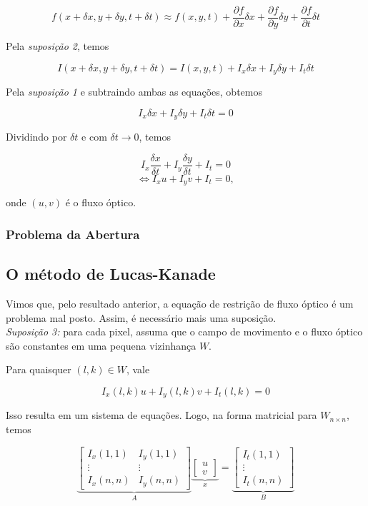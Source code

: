 \documentclass[12pt, a4paper]{article}
\begin{document}
\[ f(x + \delta x, y + \delta y, t + \delta t) \approx f(x, y, t) + \frac{\partial f}{\partial x} \delta x + \frac{\partial f}{\partial y} \delta y + \frac{\partial f}{\partial t} \delta t \]

Pela \textit{suposição 2}, temos

\[ I(x + \delta x, y + \delta y, t + \delta t) = I(x, y, t) + I_x \delta x + I_y \delta y + I_t \delta t\]

Pela \textit{suposição 1} e subtraindo ambas as equações, obtemos

\[ I_x \delta x + I_y \delta y + I_t \delta t = 0\]

Dividindo por $\delta t$ e com $\delta t \to 0$, temos

\[ I_x \frac{\delta x}{\delta t} + I_y \frac{\delta y}{\delta t} + I_t  = 0\]
\[ \Leftrightarrow I_x u + I_y v + I_t  = 0, \]

onde $(u, v)$ é o fluxo óptico.

\subsubsection{Problema da Abertura}

\subsection{O método de Lucas-Kanade}

Vimos que, pelo resultado anterior, a equação de restrição de fluxo óptico é um problema mal posto. Assim, é necessário mais uma suposição. \\

\textit{Suposição 3:} para cada pixel, assuma que o campo de movimento e o fluxo óptico são constantes em uma pequena vizinhança $W$.

Para quaisquer $(l,k) \in W$, vale

\[ I_x(l,k) u + I_y(l,k) v + I_t(l,k)  = 0 \]

Isso resulta em um sistema de equações. Logo, na forma matricial para $W_{n\times n}$, temos

\[
\underbrace{
\begin{bmatrix}
I_x(1,1) & I_y(1,1) \\
\vdots & \vdots \\
I_x(n,n) & I_y(n,n)
\end{bmatrix}
}_{A}
\underbrace{
\begin{bmatrix}
u \\
v
\end{bmatrix}
}_{x}
=
\underbrace{
\begin{bmatrix}
I_t(1,1) \\
\vdots \\
I_t(n,n)
\end{bmatrix}
}_{B}
\]
\end{document}
